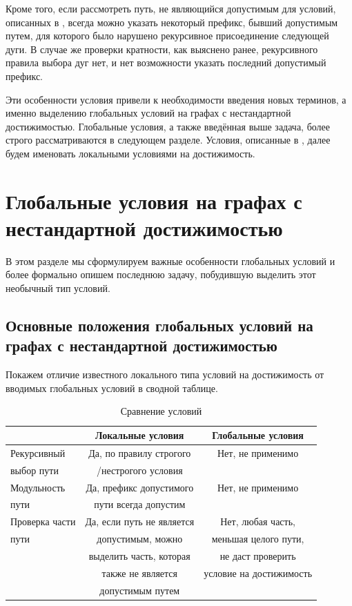 Кроме того, если рассмотреть путь, не являющийся допустимым для условий, описанных в \cite{Mono}, всегда можно указать некоторый префикс, бывший допустимым путем, для которого было нарушено рекурсивное присоединение следующей дуги. В случае же проверки кратности, как выяснено ранее, рекурсивного правила выбора дуг нет, и нет возможности указать последний допустимый префикс.  

Эти особенности условия привели к необходимости введения новых терминов, а именно выделению глобальных условий на графах с нестандартной достижимостью. Глобальные условия, а также введённая выше задача, более строго рассматриваются в следующем разделе. Условия, описанные в \cite{Mono}, далее будем именовать локальными условиями на достижимость.

\section{Глобальные условия на графах с нестандартной достижимостью}

В этом разделе мы сформулируем важные особенности глобальных условий и более формально опишем последнюю задачу, побудившую выделить этот необычный тип условий. 

\newpage

\subsection{Основные положения глобальных условий на графах с нестандартной достижимостью}

Покажем отличие известного локального типа условий на достижимость от вводимых глобальных условий в сводной таблице.

\begin{table}[h]
	\centering
	\caption{Сравнение условий}
	\begin{tabular}{l | c | c }
		& Локальные условия & Глобальные условия \\
		\hline \hline
		Рекурсивный            & Да, по правилу строгого    & Нет, не применимо \\
		выбор пути			   & /нестрогого условия	    & \\
		\hline \hline
		Модульность            & Да, префикс допустимого    & Нет, не применимо \\
		пути			       & пути всегда допустим       & \\
		\hline \hline
		Проверка части         & Да, если путь не является  & Нет, любая часть, \\
		пути			       & допустимым, можно 			& меньшая целого пути, \\
		& выделить часть, которая    & не даст проверить \\
		& также не является      	& условие на достижимость \\
		& допустимым путем
	\end{tabular}
	\label{tabl:Compare}
\end{table}

